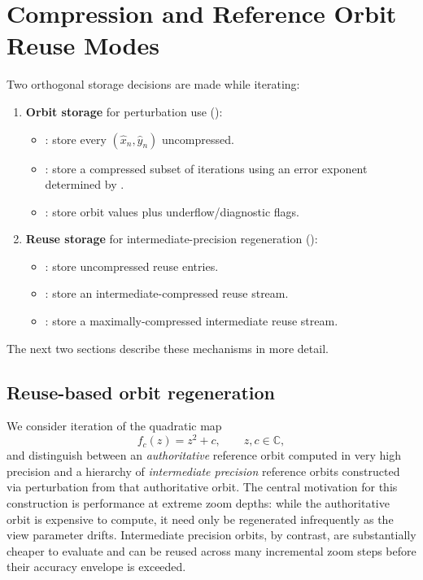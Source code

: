\section{Compression and Reference Orbit Reuse Modes}
\label{subsec:ref-orbit-compression-reuse}

Two orthogonal storage decisions are made while iterating:

\begin{enumerate}
  \item \textbf{Orbit storage} for perturbation use ():
  \begin{itemize}
    \item {}: store every \((\hat{x}_n,\hat{y}_n)\) uncompressed.
    \item {}: store a compressed subset of iterations using an error exponent
          determined by .
    \item {}: store orbit values plus underflow/diagnostic flags.
  \end{itemize}
  \item \textbf{Reuse storage} for intermediate-precision regeneration ():
  \begin{itemize}
    \item {}: store uncompressed  reuse entries.
    \item {}: store an intermediate-compressed reuse stream.
    \item {}: store a maximally-compressed intermediate reuse stream.
  \end{itemize}
\end{enumerate}

The next two sections describe these mechanisms in more detail.

\subsection{Reuse-based orbit regeneration}
\label{subsec:ref-orbit-reuse}

We consider iteration of the quadratic map
\[
f_c(z) = z^2 + c,\qquad z,c \in \mathbb{C},
\]
and distinguish between an \emph{authoritative} reference orbit computed in very high precision and a hierarchy of
\emph{intermediate precision} reference orbits constructed via perturbation from that authoritative orbit.
The central motivation for this construction is performance at extreme zoom depths: while the authoritative orbit
is expensive to compute, it need only be regenerated infrequently as the view parameter drifts.
Intermediate precision orbits, by contrast, are substantially cheaper to evaluate and can be reused across many
incremental zoom steps before their accuracy envelope is exceeded.

